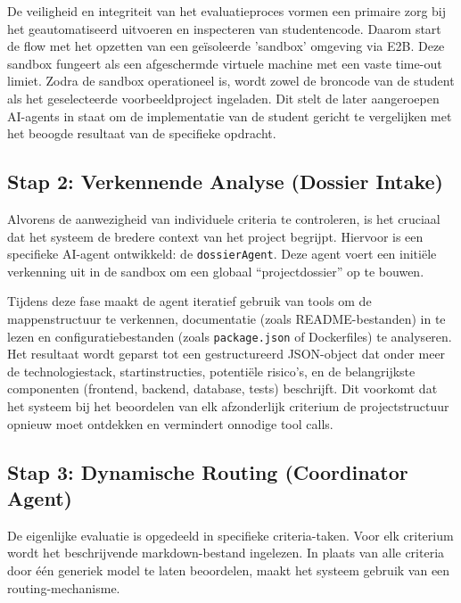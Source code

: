 \vspace{1em}

De veiligheid en integriteit van het evaluatieproces vormen een primaire zorg bij het geautomatiseerd uitvoeren en inspecteren van studentencode. Daarom start de flow met het opzetten van een geïsoleerde 'sandbox' omgeving via E2B. Deze sandbox fungeert als een afgeschermde virtuele machine met een vaste time-out limiet. Zodra de sandbox operationeel is, wordt zowel de broncode van de student als het geselecteerde voorbeeldproject ingeladen. Dit stelt de later aangeroepen AI-agents in staat om de implementatie van de student gericht te vergelijken met het beoogde resultaat van de specifieke opdracht.

\subsection{Stap 2: Verkennende Analyse (Dossier Intake)}

Alvorens de aanwezigheid van individuele criteria te controleren, is het cruciaal dat het systeem de bredere context van het project begrijpt. Hiervoor is een specifieke AI-agent ontwikkeld: de \texttt{dossierAgent}. Deze agent voert een initiële verkenning uit in de sandbox om een globaal ``projectdossier'' op te bouwen.

\vspace{1em}

Tijdens deze fase maakt de agent iteratief gebruik van tools om de mappenstructuur te verkennen, documentatie (zoals README-bestanden) in te lezen en configuratiebestanden (zoals \texttt{package.json} of Dockerfiles) te analyseren. Het resultaat wordt geparst tot een gestructureerd JSON-object dat onder meer de technologiestack, startinstructies, potentiële risico's, en de belangrijkste componenten (frontend, backend, database, tests) beschrijft. Dit voorkomt dat het systeem bij het beoordelen van elk afzonderlijk criterium de projectstructuur opnieuw moet ontdekken en vermindert onnodige tool calls.

\subsection{Stap 3: Dynamische Routing (Coordinator Agent)}

De eigenlijke evaluatie is opgedeeld in specifieke criteria-taken. Voor elk criterium wordt het beschrijvende markdown-bestand ingelezen. In plaats van alle criteria door één generiek model te laten beoordelen, maakt het systeem gebruik van een routing-mechanisme.

